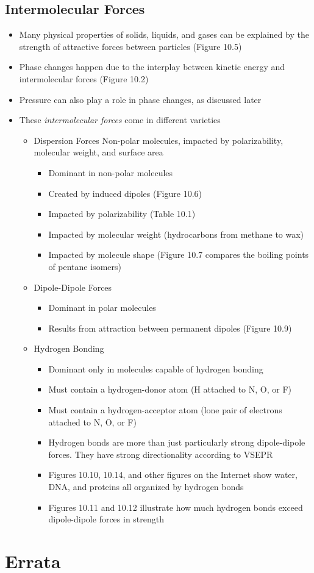 \documentclass[12pt, openany, letterpaper]{memoir}
\begin{document}
\section{Intermolecular Forces}
\begin{itemize}
  \item Many physical properties of solids, liquids, and gases can be explained by the strength of attractive forces between particles (Figure 10.5)
  \item Phase changes happen due to the interplay between kinetic energy and intermolecular forces (Figure 10.2)
  \item Pressure can also play a role in phase changes, as discussed later
  \item These \emph{intermolecular forces} come in different varieties
  \begin{itemize}
    \item Dispersion Forces Non-polar molecules, impacted by polarizability, molecular weight, and surface area
    \begin{itemize}
      \item Dominant in non-polar molecules
      \item Created by induced dipoles (Figure 10.6)
      \item Impacted by polarizability (Table 10.1)
      \item Impacted by molecular weight (hydrocarbons from methane to wax)
      \item Impacted by molecule shape (Figure 10.7 compares the boiling points of pentane isomers)
    \end{itemize}
    \item Dipole-Dipole Forces
    \begin{itemize}
      \item Dominant in polar molecules
      \item Results from attraction between permanent dipoles (Figure 10.9)
    \end{itemize}
  \item Hydrogen Bonding
    \begin{itemize}
      \item Dominant only in molecules capable of hydrogen bonding
      \item Must contain a hydrogen-donor atom (H attached to N, O, or F)
      \item Must contain a hydrogen-acceptor atom (lone pair of electrons attached to N, O, or F)
      \item Hydrogen bonds are more than just particularly strong dipole-dipole forces. They have strong directionality according to VSEPR
      \item Figures 10.10, 10.14, and other figures on the Internet show water, DNA, and proteins all organized by hydrogen bonds
      \item Figures 10.11 and 10.12 illustrate how much hydrogen bonds exceed dipole-dipole forces in strength
    \end{itemize}
  \end{itemize}
\end{itemize}
\backmatter
\chapter{Errata}
\end{document}
